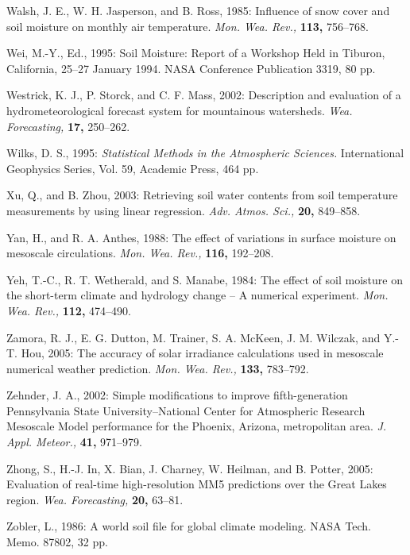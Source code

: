 \documentclass[twocolumn]{article}
\begin{document}
\begin{references}
{\item Walsh, J. E., W. H. Jasperson, and B. Ross, 1985: Influence of snow cover and soil moisture on monthly air temperature. \textit{Mon. Wea. Rev.,} \textbf{113,} 756--768.

\item Wei, M.-Y., Ed., 1995: Soil Moisture: Report of a Workshop Held in Tiburon, California, 25--27 January 1994. NASA Conference Publication 3319, 80 pp.

\item Westrick, K. J., P. Storck, and C. F. Mass, 2002: Description and evaluation of a hydrometeorological forecast system for mountainous watersheds. \textit{Wea. Forecasting,} \textbf{17,} 250--262.

\item Wilks, D. S., 1995: \textit{Statistical Methods in the Atmospheric Sciences.} International Geophysics Series, Vol. 59, Academic Press, 464 pp.

\item Xu, Q., and B. Zhou, 2003: Retrieving soil water contents from soil temperature measurements by using linear regression. \textit{Adv. Atmos. Sci.,} \textbf{20,} 849--858.

\item Yan, H., and R. A. Anthes, 1988: The effect of variations in surface moisture on mesoscale circulations. \textit{Mon. Wea. Rev.,} \textbf{116,} 192--208.

\item Yeh, T.-C., R. T. Wetherald, and S. Manabe, 1984: The effect of soil moisture on the short-term climate and hydrology change -- A numerical experiment. \textit{Mon. Wea. Rev.,} \textbf{112,} 474--490.

\item Zamora, R. J., E. G. Dutton, M. Trainer, S. A. McKeen, J. M. Wilczak, and Y.-T. Hou, 2005: The accuracy of solar irradiance calculations used in mesoscale numerical weather prediction. \textit{Mon. Wea. Rev.,} \textbf{133,} 783--792.

\item Zehnder, J. A., 2002: Simple modifications to improve fifth-generation Pennsylvania State University--National Center for Atmospheric Research  Mesoscale Model performance for the Phoenix, Arizona, metropolitan area. \textit{J. Appl. Meteor.,} \textbf{41,} 971--979.

\item Zhong, S., H.-J. In, X. Bian, J. Charney, W. Heilman, and B. Potter, 2005: Evaluation of real-time high-resolution MM5 predictions over the Great Lakes region. \textit{Wea. Forecasting,} \textbf{20,} 63--81.

\item Zobler, L., 1986: A world soil file for global climate modeling. NASA Tech. Memo. 87802, 32 pp.

}	%
\end{references}
\end{document}
